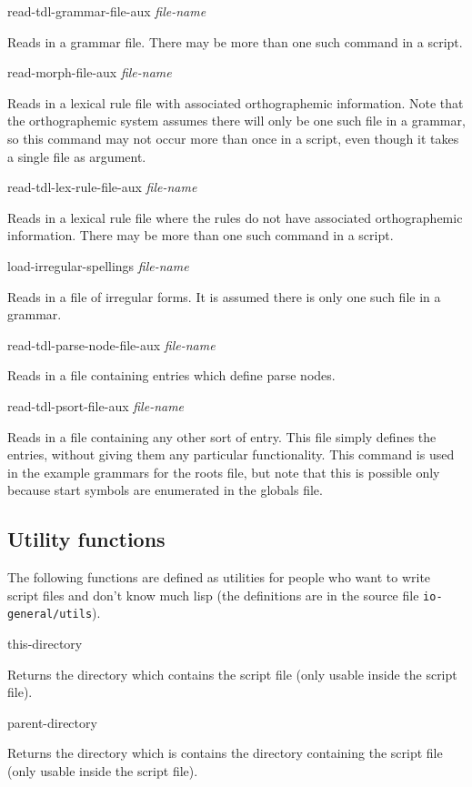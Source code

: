 \documentclass[12pt]{report}
\newcommand{\lispcommand}[1]{\noindent\rm #1}%
\newcommand{\filename}[1]{{\tt #1}}
\begin{document}
\lispcommand{read-tdl-grammar-file-aux {\it file-name}}

Reads in a grammar file. There may be more than one such command
in a script.

\lispcommand{read-morph-file-aux {\it file-name}}

Reads in a lexical rule file with associated orthographemic information.
Note that the orthographemic system assumes there will only
be one such file in a grammar, so this command
may not occur more than once in a script, even 
though it takes a single file as argument.

\lispcommand{read-tdl-lex-rule-file-aux {\it file-name}}

Reads in a lexical rule file where the rules do not have
associated orthographemic information.
There may be more than one such command
in a script.

\lispcommand{load-irregular-spellings {\it file-name}}

Reads in a file of irregular forms.  It is assumed there is
only one such file in a grammar.

\lispcommand{read-tdl-parse-node-file-aux {\it file-name}}

Reads in a file containing entries which define parse nodes.

\lispcommand{read-tdl-psort-file-aux {\it file-name}}

Reads in a file containing any other sort of entry.  
This file simply defines the entries, without giving them
any particular functionality.
This command is used
in the example grammars for the
roots file, but note that this is possible only because start symbols
are enumerated in the globals file.

\subsection{Utility functions}

The following functions are defined as utilities for people
who want to write script files and don't know much
lisp  (the definitions are in the source file \filename{io-general/utils}).

\lispcommand{this-directory}

Returns the directory which contains the script file (only
usable inside the script file).

\lispcommand{parent-directory}

Returns the directory which is contains the directory containing 
the script file (only
usable inside the script file).
\end{document}
